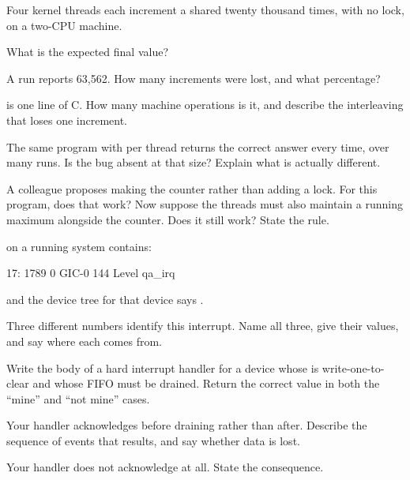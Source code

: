 Four kernel threads each increment a shared  twenty thousand times, with no
lock, on a two-CPU machine.

 What is the expected final value? 

 A run reports 63,562. How many increments were lost, and what percentage? 

  is one line of C. How many machine operations is it, and describe the
interleaving that loses one increment. 

 The same program with  per thread returns the correct answer every
time, over many runs. Is the bug absent at that size? Explain what is actually different. 

 A colleague proposes making the counter  rather than adding a lock. For
this program, does that work? Now suppose the threads must also maintain a running maximum alongside
the counter. Does it still work? State the rule. 

\label{exa:q:8}

 on a running system contains:

\begin{console}
 17:       1789          0  GIC-0 144 Level     qa_irq
\end{console}

\noindent and the device tree for that device says .

 Three different numbers identify this interrupt. Name all three, give their values, and
say where each comes from. 

 Write the body of a hard interrupt handler for a device whose  is
write-one-to-clear and whose FIFO must be drained. Return the correct value in both the ``mine'' and
``not mine'' cases. 

 Your handler acknowledges before draining rather than after. Describe the sequence of
events that results, and say whether data is lost. 

 Your handler does not acknowledge at all. State the consequence. 

\label{exa:q:9}

